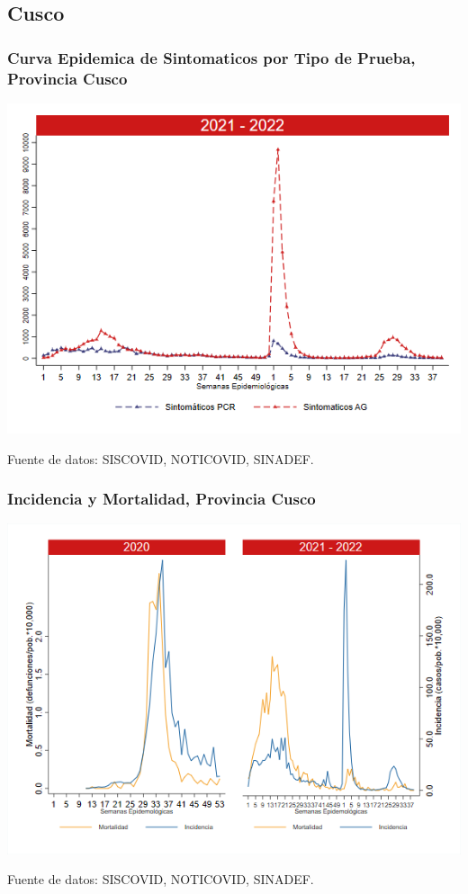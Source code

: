 \documentclass[xcolor=table]{beamer}
\begin{document}
\subsection{Cusco}
\begin{frame}[label=Cusco]
	\frametitle{Curva Epidemica de Sintomaticos por Tipo de Prueba, Provincia Cusco}
	\vspace{-.5cm}
	\begin{center}
		\includegraphics[width=0.8\linewidth, trim={0cm .5cm 0cm 0.2cm},clip]{../figuras/sinto_prueba20_21_7.png}
	\end{center}
	{\tiny Fuente de datos: SISCOVID, NOTICOVID, SINADEF.}
	\hyperlink{TipoPrueba}{}
\end{frame}

\begin{frame}[label=Cusco]
	\frametitle{Incidencia y Mortalidad, Provincia Cusco}
	\vspace{-.5cm}
	\begin{center}
		\includegraphics[width=0.8\linewidth, trim={0cm .5cm 0cm 0.2cm},clip]{../figuras/incidencia_mortalidad_20_21_7.png}
	\end{center}
	{\tiny Fuente de datos: SISCOVID, NOTICOVID, SINADEF.}
\end{frame}
\end{document}
